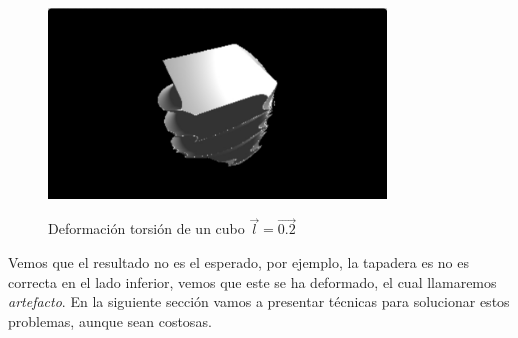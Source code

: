 \begin{figure}[H]
  \centering
  \captionsetup{justification=centering}%
  \includegraphics[width=0.8\textwidth]{secciones/imagenes/sdf_twist.jpeg}\label{fig:twist}
  \caption{Deformación torsión de un cubo \(\Vec{l}=\Vec{0.2}\)}
\end{figure}

Vemos que el resultado no es el esperado, por ejemplo, la tapadera es no es correcta en el lado inferior, vemos que este se ha deformado, el cual llamaremos \textit{artefacto}. En la siguiente sección vamos a presentar técnicas para solucionar estos problemas, aunque sean costosas.